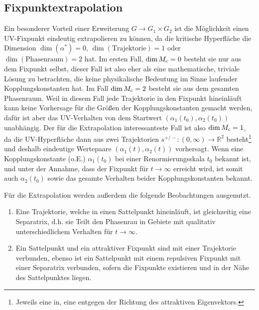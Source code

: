  \subsection{Fixpunktextrapolation}
    Ein besonderer Vorteil einer Erweiterung $G \to G_1\times G_2$ ist die 
    Möglichkeit einen UV-Fixpunkt eindeutig extrapolieren zu können, da die 
    kritische Hyperfläche die Dimension $\dim(\alpha^*)=0$, 
    $\dim(\text{Trajektorie})=1$ oder $\dim(\text{Phasenraum})=2$ hat. Im 
    ersten Fall, $\dim M_\text{c}=0$ besteht sie nur aus dem Fixpunkt selbst, 
    dieser Fall ist also eher als eine mathematische, triviale Lösung zu 
    betrachten, die keine physikalische Bedeutung im Sinne laufender 
    Kopplungskonstanten hat. Im Fall $\dim M_\text{c} =2$ besteht sie aus dem gesamten 
    Phasenraum. Weil in diesem Fall jede Trajektorie in den Fixpunkt 
    hineinläuft kann keine Vorhersage für die Größen der Kopplungskonstanten 
    gemacht werden, dafür ist aber das UV-Verhalten von dem Startwert 
    $\left(\alpha_1(t_0),\alpha_2(t_0)\right)$ unabhängig. Der für die 
    Extrapolation interessanteste Fall ist also $\dim M_\text{c} = 1$, da die 
    UV-Hyperfläche dann aus zwei Trajektorien 
    $s^{+/-}:(0,\infty)\to \mathbb{R}^2$ besteht\footnote{Jeweils eine in, eine 
    entgegen der Richtung des attraktiven Eigenvektors.} und deshalb 
    eindeutige Wertepaare $(\alpha_1(t),\alpha_2(t))$ vorhersagt. Wenn eine 
    Kopplungskonstante (o.E.) $\alpha_1(t_0)$ bei einer Renormierungsskala 
    $t_0$ bekannt ist, und unter der Annahme, dass der Fixpunkt für 
    $t\to\infty$ erreicht wird, ist somit auch $\alpha_2(t_0)$ sowie das 
    gesamte Verhalten beider Kopplungskonstanten bekannt.
    
    Für die Extrapolation werden außerdem die folgende Beobachtungen ausgenutzt.
    \begin{enumerate}
     \item Eine Trajektorie, welche in einen Sattelpunkt hineinläuft, ist 
     gleichzeitig eine Separatrix, d.h. sie Teilt den Phasenrau in Gebiete mit 
     qualitativ unterschiedlichem  Verhalten für $t \to \infty$.
     \item Ein Sattelpunkt und ein attraktiver Fixpunkt sind mit einer 
     Trajektorie verbunden, ebenso ist ein Sattelpunkt mit einem repulsiven 
     Fixpunkt mit einer Separatrix verbunden, sofern die Fixpunkte existieren 
     und in der Nähe des Sattelpunktes liegen. 
    \end{enumerate}

